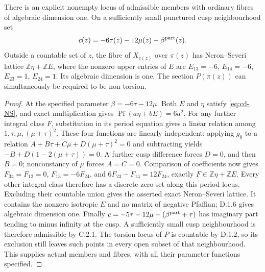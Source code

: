 \begin{proposition}[D.1.7; Proved]\label{st:D.1.7}
There is an explicit nonempty locus of admissible members with ordinary
fibres of algebraic dimension one. On a sufficiently small punctured
cusp neighbourhood set
\[
 c(z)=-6\tau(z)-12\mu(z)-\beta^{\rm part}(z).
\]
Outside a countable set of $z$, the fibre of $X_{c(z)}$ over $\pi(z)$ has
Neron--Severi lattice $\mathbb Z\eta+\mathbb ZE$, where the nonzero upper
entries of $E$ are
$E_{13}=-6$, $E_{14}=-6$, $E_{23}=1$, $E_{24}=1$.
Its algebraic dimension is one. The section $P(\pi(z))$ can simultaneously
be required to be non-torsion.
\end{proposition}
\begin{proof}
At the specified parameter $\beta=-6\tau-12\mu$. Both $E$ and $\eta$
satisfy \eqref{eq:cd-NS}, and exact multiplication gives
$\operatorname{Pf}(a\eta+bE)=6a^2$.
For any further integral class $F$, substitution in its period equation
gives a linear relation among $1,\tau,\mu,(\mu+\tau)^2$.
These four functions are linearly independent: applying $g_0$ to a
relation $A+B\tau+C\mu+D(\mu+\tau)^2=0$ and subtracting yields
$-B+D(1-2(\mu+\tau))=0$. A further cusp difference forces $D=0$,
and then $B=0$; nonconstancy of $\mu$ forces $A=C=0$.
Comparison of coefficients now gives
$F_{34}=F_{12}=0$, $F_{13}=-6F_{24}$, and
$6F_{23}-F_{14}=12F_{24}$, exactly
$F\in\mathbb Z\eta+\mathbb ZE$. Every other integral class therefore
has a discrete zero set along this period locus. Excluding their
countable union gives the asserted exact Neron--Severi lattice.
It contains the nonzero isotropic $E$ and no matrix of negative
Pfaffian; D.1.6 gives algebraic dimension one.
Finally
$c=-5\tau-12\mu-(\beta^{\rm part}+\tau)$ has imaginary part tending
to minus infinity at the cusp. A sufficiently small cusp neighbourhood
is therefore admissible by C.2.1. The torsion locus of $P$ is countable
by D.1.2, so its exclusion still leaves such points in every open subset
of that neighbourhood. This supplies actual members and fibres, with
all their parameter functions specified.
\end{proof}

